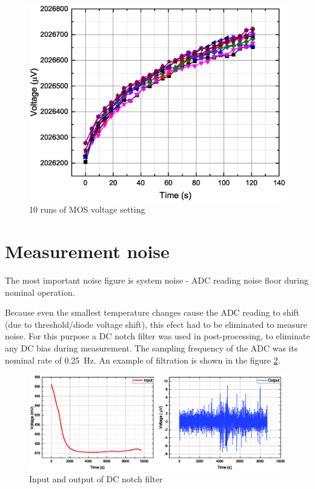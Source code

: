     \begin{figure}[H]
        \centering
        \includegraphics[width=0.8\paperwidth]{img/07/MOS_settling.eps}
        \caption{10 runs of MOS voltage setting}
        \label{MOS_settling}
    \end{figure}

\section{Measurement noise}
    The most important noise figure is system noise - ADC reading noise floor during nominal operation.

    Because even the smallest temperature changes cause the ADC reading to shift (due to threshold/diode voltage shift), this efect had to be eliminated to measure noise. For this purpose a DC notch filter was used in post-processing, to eliminate any DC bias during measurement. The sampling frequency of the ADC was its nominal rate of \SI{0.25}{\hertz}. An example of filtration is shown in the figure \ref{notch_DC_example}.

    \begin{figure}[H]
        \centering
        \includegraphics[width=0.8\paperwidth]{img/07/filterBeforeAfter.eps}
        \caption{Input and output of DC notch filter}
        \label{notch_DC_example}
    \end{figure}

